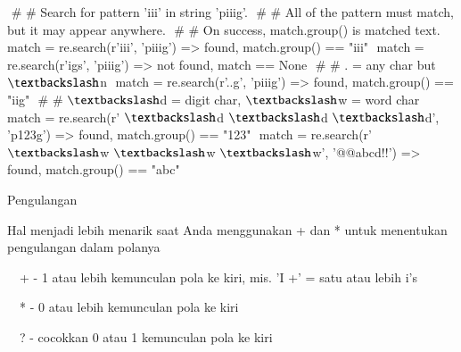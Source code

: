 \documentclass[a4paper,12pt]{report}
\begin{document}
{\fontsize{10pt}{10pt}\selectfont  $  $  $  \#  $ $  \#  $ Search for pattern 'iii' in string 'piiig'.\vspace{\baselineskip}
 $  $  $  \#  $ $  \#  $ All of the pattern must match, but it may appear anywhere.\vspace{\baselineskip}
 $  $  $  \#  $ $  \#  $ On success, match.group() is matched text.\vspace{\baselineskip}
 $  $ match = re.search(r'iii', 'piiig') =>  $  $found, match.group() == "iii"\vspace{\baselineskip}
 $  $ match = re.search(r'igs', 'piiig') =>  $  $not found, match == None\vspace{\baselineskip}
\vspace{\baselineskip}
 $  $  $  \#  $ $  \#  $ . = any char but  $  \textbackslash  $n\vspace{\baselineskip}
 $  $ match = re.search(r'..g', 'piiig') =>  $  $found, match.group() == "iig"\vspace{\baselineskip}
\vspace{\baselineskip}
 $  $  $  \#  $ $  \#  $  $  \textbackslash  $d = digit char,  $  \textbackslash  $w = word char\vspace{\baselineskip}
 $  $ match = re.search(r' $  \textbackslash  $d $  \textbackslash  $d $  \textbackslash  $d', 'p123g') =>  $  $found, match.group() == "123"\vspace{\baselineskip}
 $  $ match = re.search(r' $  \textbackslash  $w $  \textbackslash  $w $  \textbackslash  $w', '@@abcd!!') =>  $  $found, match.group() == "abc"} \par
\noindent 
\vspace{10pt}
\noindent 
\vspace{10pt}
\noindent 
Pengulangan \par
\noindent 
\vspace{12pt}
\noindent 
Hal menjadi lebih menarik saat Anda menggunakan + dan * untuk menentukan pengulangan dalam polanya \par
\noindent 
\vspace{12pt}
\noindent 
 $  $ $  $ $  $ $  $+ - 1 atau lebih kemunculan pola ke kiri, mis. 'I +' = satu atau lebih i's \par
\noindent 
 $  $ $  $ $  $ $  $* - 0 atau lebih kemunculan pola ke kiri \par
\noindent 
 $  $ $  $ $  $ $  $? - cocokkan 0 atau 1 kemunculan pola ke kiri \par
\noindent 
\vspace{12pt}
\end{document}
